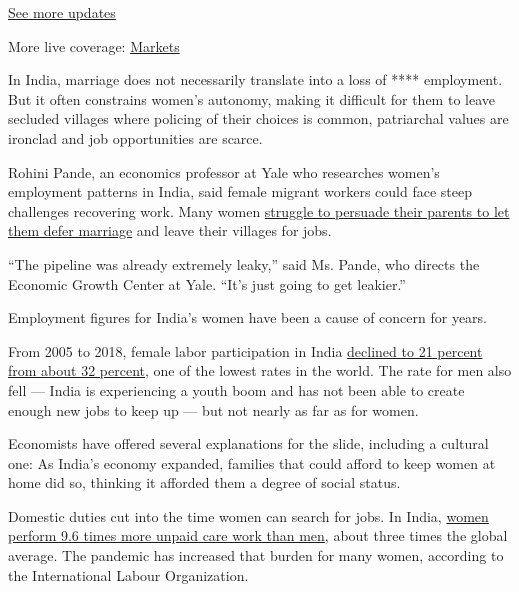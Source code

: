 \href{https://www.nytimes.com/2020/08/01/world/coronavirus-covid-19.html?action=click\&pgtype=Article\&state=default\&region=MAIN_CONTENT_1\&context=storylines_live_updates}{See
more updates}

More live coverage:
\href{https://www.nytimes.com/live/2020/07/31/business/stock-market-today-coronavirus?action=click\&pgtype=Article\&state=default\&region=MAIN_CONTENT_1\&context=storylines_live_updates}{Markets}

In India, marriage does not necessarily translate into a loss of ****
employment. But it often constrains women's autonomy, making it
difficult for them to leave secluded villages where policing of their
choices is common, patriarchal values are ironclad and job opportunities
are scarce.

Rohini Pande, an economics professor at Yale who researches women's
employment patterns in India, said female migrant workers could face
steep challenges recovering work. Many women
\href{https://www.nytimes.com/2016/09/25/world/asia/bangalore-india-women-factories.html}{struggle
to persuade their parents to let them defer marriage} and leave their
villages for jobs.

``The pipeline was already extremely leaky,'' said Ms. Pande, who
directs the Economic Growth Center at Yale. ``It's just going to get
leakier.''

Employment figures for India's women have been a cause of concern for
years.

From 2005 to 2018, female labor participation in India
\href{https://data.worldbank.org/indicator/SL.TLF.CACT.FE.ZS?locations=IN}{declined
to 21 percent from about 32 percent}, one of the lowest rates in the
world. The rate for men also fell --- India is experiencing a youth boom
and has not been able to create enough new jobs to keep up --- but not
nearly as far as for women.

Economists have offered several explanations for the slide, including a
cultural one: As India's economy expanded, families that could afford to
keep women at home did so, thinking it afforded them a degree of social
status.

Domestic duties cut into the time women can search for jobs. In India,
\href{https://www.ilo.org/wcmsp5/groups/public/---dgreports/---dcomm/---publ/documents/publication/wcms_633135.pdf}{women
perform 9.6 times more unpaid care work than men}, about three times the
global average. The pandemic has increased that burden for many women,
according to the International Labour Organization.

